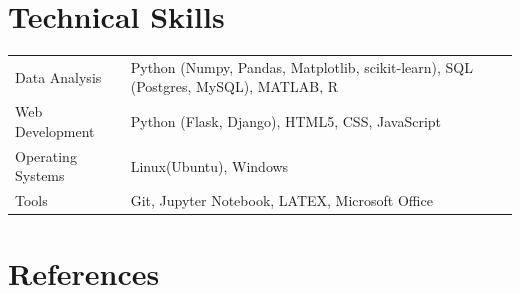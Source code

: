 \documentclass[a4paper,12pt]{article}
\begin{document}
\section{Technical Skills}
\begin{tabularx}{\linewidth}{@{}l X@{}}
    Data Analysis &  \normalsize{Python (Numpy, Pandas, Matplotlib, scikit-learn), SQL (Postgres, MySQL), MATLAB, R}\\
    Web Development &  \normalsize{Python (Flask, Django), HTML5, CSS, JavaScript}\\
    Operating Systems &  \normalsize{Linux(Ubuntu), Windows}\\  
    Tools &  \normalsize{Git, Jupyter Notebook, LATEX, Microsoft Office}\\ 
    
\end{tabularx}

    


\section{References}
\end{document}
